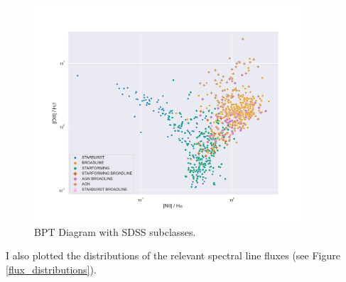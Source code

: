 \documentclass[letterpaper, oneside]{article}
\begin{document}
\begin{figure}[h]
	\centering
	\includegraphics[width=0.9\textwidth]{../BPT_diagram_sdss_subclasses.pdf}
	\caption{BPT Diagram with SDSS subclasses.}
	\label{fig:BPT_subclasses}
\end{figure}

I also plotted the distributions of the relevant spectral line fluxes (see Figure \ref{flux_distributions}).
\end{document}
